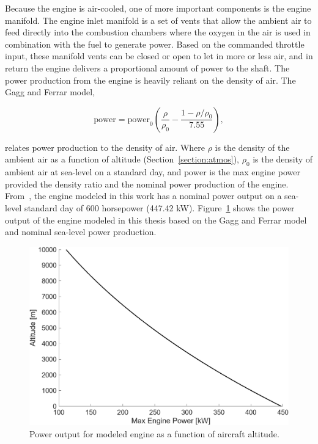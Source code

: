 Because the engine is air-cooled, one of more important components is the engine manifold. The engine inlet manifold is a set of vents that allow the ambient air to feed directly into the combustion chambers where the oxygen in the air is used in combination with the fuel to generate power. Based on the commanded throttle input, these manifold vents can be closed or open to let in more or less air, and in return the engine delivers a proportional amount of power to the shaft. The power production from the engine is heavily reliant on the density of air. The Gagg and Ferrar model,

\begin{equation}\label{eq:gaggandferrar}
    \textrm{power} = \textrm{power}_{0}\left(\frac{\rho}{\rho_0} - \frac{1 - \rho/\rho_0}{7.55}\right),
\end{equation}

relates power production to the density of air. Where \(\rho \) is the density of the ambient air as a function of altitude (Section~\ref{section:atmos}), \(\rho_0\) is the density of ambient air at sea-level on a standard day, and \(\textrm{power}\) is the max engine power provided the density ratio and the nominal power production of the engine. From~\cite{hartzellpropellerHartzellPropellerManual2023}, the engine modeled in this work has a nominal power output on a sea-level standard day of 600 horsepower (447.42 kW). Figure~\ref{fig:gaggferrar} shows the power output of the engine modeled in this thesis based on the Gagg and Ferrar model and nominal sea-level power production.

\begin{figure}[!ht]\label{fig:gaggferrar}
    \centering
    \includegraphics[width=0.85\linewidth]{Figures/gaggferrar.png}
    \caption{Power output for modeled engine as a function of aircraft altitude.}
\end{figure}

